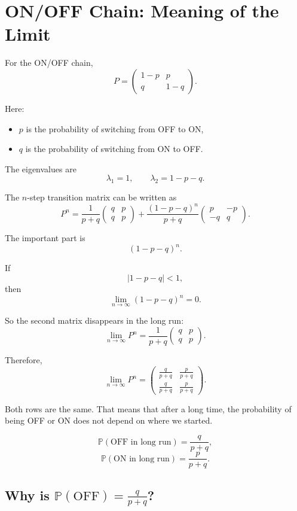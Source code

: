 \documentclass[12pt,a4paper]{article}
\theoremstyle{notestyle}
\newcommand{\Prob}{\mathbb{P}}
\begin{document}
\section{ON/OFF Chain: Meaning of the Limit}

For the ON/OFF chain,
\[
P=
\begin{pmatrix}
1-p & p\\
q & 1-q
\end{pmatrix}.
\]

Here:
\begin{itemize}[leftmargin=1.2cm]
    \item $p$ is the probability of switching from OFF to ON,
    \item $q$ is the probability of switching from ON to OFF.
\end{itemize}

The eigenvalues are
\[
\lambda_1=1,
\qquad
\lambda_2=1-p-q.
\]

The $n$-step transition matrix can be written as
\[
P^n=
\frac{1}{p+q}
\begin{pmatrix}
q & p\\
q & p
\end{pmatrix}
+
\frac{(1-p-q)^n}{p+q}
\begin{pmatrix}
p & -p\\
-q & q
\end{pmatrix}.
\]

The important part is
\[
(1-p-q)^n.
\]

If
\[
|1-p-q|<1,
\]
then
\[
\lim_{n\to\infty}(1-p-q)^n=0.
\]

So the second matrix disappears in the long run:
\[
\lim_{n\to\infty}P^n=
\frac{1}{p+q}
\begin{pmatrix}
q & p\\
q & p
\end{pmatrix}.
\]

Therefore,
\[
\lim_{n\to\infty}P^n=
\begin{pmatrix}
\frac{q}{p+q} & \frac{p}{p+q}\\
\frac{q}{p+q} & \frac{p}{p+q}
\end{pmatrix}.
\]

Both rows are the same. That means that after a long time, the probability of being OFF or ON does not depend on where we started.

\[
\Prob(\text{OFF in long run})=\frac{q}{p+q},
\]
\[
\Prob(\text{ON in long run})=\frac{p}{p+q}.
\]

\subsection*{Why is $\Prob(\text{OFF})=\frac{q}{p+q}$?}
\end{document}
